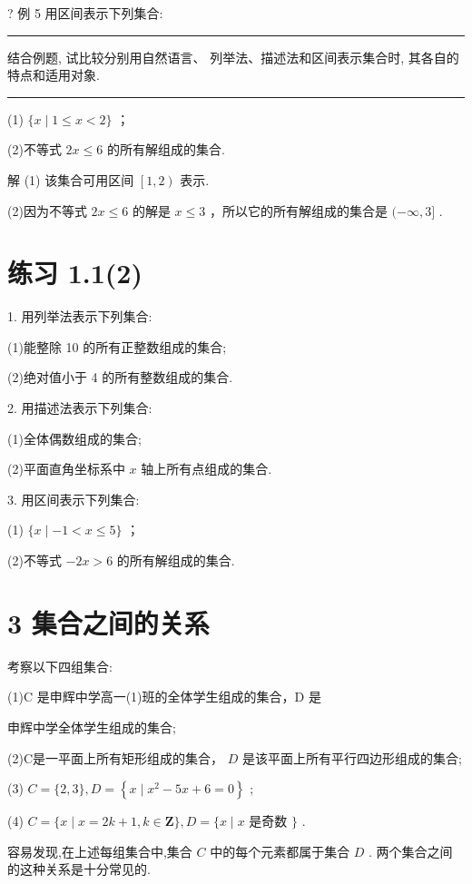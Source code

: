\documentclass[10pt]{article}
\newcommand{\HRule}{\begin{center}\rule{0.9\linewidth}{0.2mm}\end{center}}
\begin{document}
? 例 5 用区间表示下列集合:

\HRule

结合例题, 试比较分别用自然语言、 列举法、描述法和区间表示集合时, 其各自的特点和适用对象.

\HRule

(1) \(\{ x \mid  1 \leq  x < 2\}\) ；

(2)不等式 \({2x} \leq  6\) 的所有解组成的集合.

解 (1) 该集合可用区间 \(\left\lbrack  {1,2}\right)\) 表示.

(2)因为不等式 \({2x} \leq  6\) 的解是 \(x \leq  3\) ，所以它的所有解组成的集合是 \(( - \infty ,3\rbrack\) .

\section*{练习 1.1(2)}

1. 用列举法表示下列集合:

(1)能整除 10 的所有正整数组成的集合;

(2)绝对值小于 4 的所有整数组成的集合.

2. 用描述法表示下列集合:

(1)全体偶数组成的集合;

(2)平面直角坐标系中 \(x\) 轴上所有点组成的集合.

3. 用区间表示下列集合:

(1) \(\{ x \mid   - 1 < x \leq  5\}\) ；

(2)不等式 \(- {2x} > 6\) 的所有解组成的集合.

\section*{3 集合之间的关系}

考察以下四组集合:

(1)C 是申辉中学高一(1)班的全体学生组成的集合，D 是



申辉中学全体学生组成的集合;

(2)C是一平面上所有矩形组成的集合， \(D\) 是该平面上所有平行四边形组成的集合;

(3) \(C = \{ 2,3\} ,D = \left\{  {x \mid  {x}^{2} - {5x} + 6 = 0}\right\}\) ;

(4) \(C = \{ x \mid  x = {2k} + 1,k \in  \mathbf{Z}\} ,D = \{ x \mid  x\) 是奇数 \(\}\) .

容易发现,在上述每组集合中,集合 \(C\) 中的每个元素都属于集合 \(D\) . 两个集合之间的这种关系是十分常见的.
\end{document}
